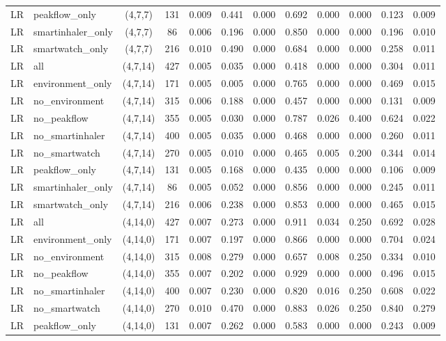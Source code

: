\begin{longtable}{llcccccccccc}
LR & peakflow\_only & (4,7,7) & 131 & 0.009 & 0.441 & 0.000 & 0.692 & 0.000 & 0.000 & 0.123 & 0.009 \\
LR & smartinhaler\_only & (4,7,7) & 86 & 0.006 & 0.196 & 0.000 & 0.850 & 0.000 & 0.000 & 0.196 & 0.010 \\
LR & smartwatch\_only & (4,7,7) & 216 & 0.010 & 0.490 & 0.000 & 0.684 & 0.000 & 0.000 & 0.258 & 0.011 \\
LR & all & (4,7,14) & 427 & 0.005 & 0.035 & 0.000 & 0.418 & 0.000 & 0.000 & 0.304 & 0.011 \\
LR & environment\_only & (4,7,14) & 171 & 0.005 & 0.005 & 0.000 & 0.765 & 0.000 & 0.000 & 0.469 & 0.015 \\
LR & no\_environment & (4,7,14) & 315 & 0.006 & 0.188 & 0.000 & 0.457 & 0.000 & 0.000 & 0.131 & 0.009 \\
LR & no\_peakflow & (4,7,14) & 355 & 0.005 & 0.030 & 0.000 & 0.787 & 0.026 & 0.400 & 0.624 & 0.022 \\
LR & no\_smartinhaler & (4,7,14) & 400 & 0.005 & 0.035 & 0.000 & 0.468 & 0.000 & 0.000 & 0.260 & 0.011 \\
LR & no\_smartwatch & (4,7,14) & 270 & 0.005 & 0.010 & 0.000 & 0.465 & 0.005 & 0.200 & 0.344 & 0.014 \\
LR & peakflow\_only & (4,7,14) & 131 & 0.005 & 0.168 & 0.000 & 0.435 & 0.000 & 0.000 & 0.106 & 0.009 \\
LR & smartinhaler\_only & (4,7,14) & 86 & 0.005 & 0.052 & 0.000 & 0.856 & 0.000 & 0.000 & 0.245 & 0.011 \\
LR & smartwatch\_only & (4,7,14) & 216 & 0.006 & 0.238 & 0.000 & 0.853 & 0.000 & 0.000 & 0.465 & 0.015 \\
LR & all & (4,14,0) & 427 & 0.007 & 0.273 & 0.000 & 0.911 & 0.034 & 0.250 & 0.692 & 0.028 \\
LR & environment\_only & (4,14,0) & 171 & 0.007 & 0.197 & 0.000 & 0.866 & 0.000 & 0.000 & 0.704 & 0.024 \\
LR & no\_environment & (4,14,0) & 315 & 0.008 & 0.279 & 0.000 & 0.657 & 0.008 & 0.250 & 0.334 & 0.010 \\
LR & no\_peakflow & (4,14,0) & 355 & 0.007 & 0.202 & 0.000 & 0.929 & 0.000 & 0.000 & 0.496 & 0.015 \\
LR & no\_smartinhaler & (4,14,0) & 400 & 0.007 & 0.230 & 0.000 & 0.820 & 0.016 & 0.250 & 0.608 & 0.022 \\
LR & no\_smartwatch & (4,14,0) & 270 & 0.010 & 0.470 & 0.000 & 0.883 & 0.026 & 0.250 & 0.840 & 0.279 \\
LR & peakflow\_only & (4,14,0) & 131 & 0.007 & 0.262 & 0.000 & 0.583 & 0.000 & 0.000 & 0.243 & 0.009 \\

\end{longtable}
